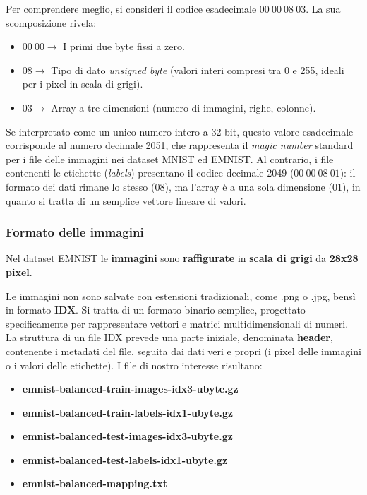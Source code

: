 \documentclass[12pt,a4paper]{article}
\begin{document}
	Per comprendere meglio, si consideri il codice esadecimale $00\ 00\ 08\ 03$. La sua scomposizione rivela:
	\begin{itemize}
		\item $00\ 00 \rightarrow$ I primi due byte fissi a zero.
		\item $08 \rightarrow$ Tipo di dato \textit{unsigned byte} (valori interi compresi tra 0 e 255, ideali per i pixel in scala di grigi).
		\item $03 \rightarrow$ Array a tre dimensioni (numero di immagini, righe, colonne).
	\end{itemize}

	Se interpretato come un unico numero intero a 32 bit, questo valore esadecimale corrisponde al numero decimale 2051, che rappresenta il \textit{magic number} standard per i file delle immagini nei dataset MNIST ed EMNIST. Al contrario, i file contenenti le etichette (\textit{labels}) presentano il codice decimale 2049 ($00\ 00\ 08\ 01$): il formato dei dati rimane lo stesso ($08$), ma l'array è a una sola dimensione ($01$), in quanto si tratta di un semplice vettore lineare di valori.

	\subsubsection{Formato delle immagini}
	Nel dataset EMNIST le \textbf{immagini} sono \textbf{raffigurate} in \textbf{scala di grigi} da \textbf{28x28 pixel}.
	\medskip

	Le immagini non sono salvate con estensioni tradizionali, come \textcolor{VerdeEstensione}{.png} o \textcolor{VerdeEstensione}{.jpg}, bensì in formato \textbf{IDX}. Si tratta di un formato binario semplice, progettato specificamente per rappresentare vettori e matrici multidimensionali di numeri. La struttura di un file IDX prevede una parte iniziale, denominata \textbf{header}, contenente i metadati del file, seguita dai dati veri e propri (i pixel delle immagini o i valori delle etichette). \newline
	\newline
	I file di nostro interesse risultano:
	\begin{itemize}
		\item \textbf{emnist-balanced-train-images-idx3-ubyte.gz}
		\item \textbf{emnist-balanced-train-labels-idx1-ubyte.gz}
		\item \textbf{emnist-balanced-test-images-idx3-ubyte.gz}
		\item \textbf{emnist-balanced-test-labels-idx1-ubyte.gz}
		\item \textbf{emnist-balanced-mapping.txt}
	\end{itemize}
\end{document}
